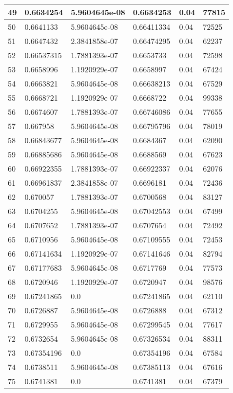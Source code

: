\begin{longtable}{|l|l|l|l|l|l|}
49 & 0.6634254 & 5.9604645e-08 & 0.6634253 & 0.04 & 77815 \\ \hline 
50 & 0.6641133 & 5.9604645e-08 & 0.66411334 & 0.04 & 72525 \\ \hline 
51 & 0.6647432 & 2.3841858e-07 & 0.66474295 & 0.04 & 62237 \\ \hline 
52 & 0.66537315 & 1.7881393e-07 & 0.6653733 & 0.04 & 72598 \\ \hline 
53 & 0.6658996 & 1.1920929e-07 & 0.6658997 & 0.04 & 67424 \\ \hline 
54 & 0.6663821 & 5.9604645e-08 & 0.66638213 & 0.04 & 67529 \\ \hline 
55 & 0.6668721 & 1.1920929e-07 & 0.6668722 & 0.04 & 99338 \\ \hline 
56 & 0.6674607 & 1.7881393e-07 & 0.66746086 & 0.04 & 77655 \\ \hline 
57 & 0.667958 & 5.9604645e-08 & 0.66795796 & 0.04 & 78019 \\ \hline 
58 & 0.66843677 & 5.9604645e-08 & 0.6684367 & 0.04 & 62090 \\ \hline 
59 & 0.66885686 & 5.9604645e-08 & 0.6688569 & 0.04 & 67623 \\ \hline 
60 & 0.66922355 & 1.7881393e-07 & 0.66922337 & 0.04 & 62076 \\ \hline 
61 & 0.66961837 & 2.3841858e-07 & 0.6696181 & 0.04 & 72436 \\ \hline 
62 & 0.670057 & 1.7881393e-07 & 0.6700568 & 0.04 & 83127 \\ \hline 
63 & 0.6704255 & 5.9604645e-08 & 0.67042553 & 0.04 & 67499 \\ \hline 
64 & 0.6707652 & 1.7881393e-07 & 0.6707654 & 0.04 & 72492 \\ \hline 
65 & 0.6710956 & 5.9604645e-08 & 0.67109555 & 0.04 & 72453 \\ \hline 
66 & 0.67141634 & 1.1920929e-07 & 0.67141646 & 0.04 & 82794 \\ \hline 
67 & 0.67177683 & 5.9604645e-08 & 0.6717769 & 0.04 & 77573 \\ \hline 
68 & 0.6720946 & 1.1920929e-07 & 0.6720947 & 0.04 & 98576 \\ \hline 
69 & 0.67241865 & 0.0 & 0.67241865 & 0.04 & 62110 \\ \hline 
70 & 0.6726887 & 5.9604645e-08 & 0.6726888 & 0.04 & 67312 \\ \hline 
71 & 0.6729955 & 5.9604645e-08 & 0.67299545 & 0.04 & 77617 \\ \hline 
72 & 0.6732654 & 5.9604645e-08 & 0.67326534 & 0.04 & 88311 \\ \hline 
73 & 0.67354196 & 0.0 & 0.67354196 & 0.04 & 67584 \\ \hline 
74 & 0.6738511 & 5.9604645e-08 & 0.67385113 & 0.04 & 67616 \\ \hline 
75 & 0.6741381 & 0.0 & 0.6741381 & 0.04 & 67379 \\ \hline 
\end{longtable}